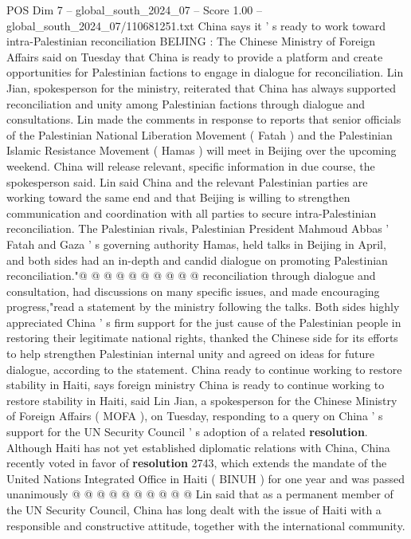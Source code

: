 \begin{textsample}{POS Dim 7 – global\_south\_2024\_07 – Score 1.00 – global\_south\_2024\_07/110681251.txt}  \label{ex:f7_pos_117}
China says it ' s ready to work toward intra-Palestinian reconciliation BEIJING : The Chinese Ministry of Foreign Affairs said on Tuesday that China is ready to provide a platform and create opportunities for Palestinian factions to engage in dialogue for reconciliation.
Lin Jian, spokesperson for the ministry, reiterated that China has always supported reconciliation and unity among Palestinian factions through dialogue and consultations.
Lin made the comments in response to reports that senior officials of the Palestinian National Liberation Movement ( Fatah ) and the Palestinian Islamic Resistance Movement ( Hamas ) will meet in Beijing over the upcoming weekend.
China will release relevant, specific information in due course, the spokesperson said.
Lin said China and the relevant Palestinian parties are working toward the same end and that Beijing is willing to strengthen communication and coordination with all parties to secure intra-Palestinian reconciliation.
The Palestinian rivals, Palestinian President Mahmoud Abbas ' Fatah and Gaza ' s governing authority Hamas, held talks in Beijing in April, and both sides had an in-depth and candid dialogue on promoting Palestinian reconciliation."@ @ @ @ @ @ @ @ @ @ reconciliation through dialogue and consultation, had discussions on many specific issues, and made encouraging progress,"read a statement by the ministry following the talks.
Both sides highly appreciated China ' s firm support for the just cause of the Palestinian people in restoring their legitimate national rights, thanked the Chinese side for its efforts to help strengthen Palestinian internal unity and agreed on ideas for future dialogue, according to the statement.
China ready to continue working to restore stability in Haiti, says foreign ministry China is ready to continue working to restore stability in Haiti, said Lin Jian, a spokesperson for the Chinese Ministry of Foreign Affairs ( MOFA ), on Tuesday, responding to a query on China ' s support for the UN Security Council ' s adoption of a related \textbf{resolution}.
Although Haiti has not yet established diplomatic relations with China, China recently voted in favor of \textbf{resolution} 2743, which extends the mandate of the United Nations Integrated Office in Haiti ( BINUH ) for one year and was passed unanimously @ @ @ @ @ @ @ @ @ @ Lin said that as a permanent member of the UN Security Council, China has long dealt with the issue of Haiti with a responsible and constructive attitude, together with the international community.

\end{textsample}
